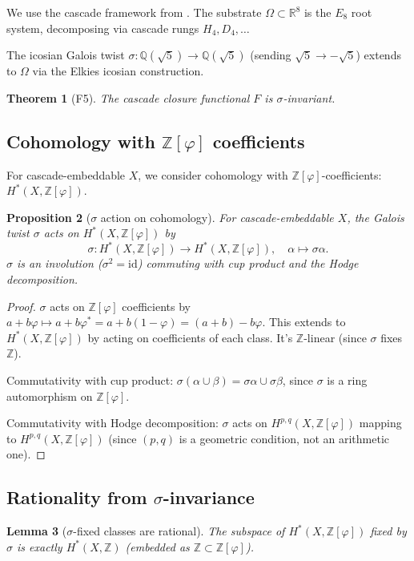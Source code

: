 \documentclass[11pt, a4paper]{amsart}
\newtheorem{theorem}{Theorem}[section]
\newtheorem{lemma}[theorem]{Lemma}
\newtheorem{proposition}[theorem]{Proposition}
\theoremstyle{definition}
\newcommand{\R}{\mathbb{R}}
\newcommand{\Z}{\mathbb{Z}}
\newcommand{\pphi}{\varphi}
\begin{document}
We use the cascade framework from \cite{CascadeFoundations}. The
substrate $\Omega \subset \R^8$ is the $E_8$ root system, decomposing
via cascade rungs $H_4, D_4, \ldots$

The icosian Galois twist $\sigma: \mathbb{Q}(\sqrt 5) \to \mathbb{Q}(\sqrt 5)$
(sending $\sqrt 5 \to -\sqrt 5$) extends to $\Omega$ via the Elkies
icosian construction.

\begin{theorem}[F5]
The cascade closure functional $F$ is $\sigma$-invariant.
\end{theorem}

\subsection{Cohomology with $\Z[\pphi]$ coefficients}

For cascade-embeddable $X$, we consider cohomology with
$\Z[\pphi]$-coefficients: $H^*(X, \Z[\pphi])$.

\begin{proposition}[$\sigma$ action on cohomology]\label{prop:sigmacohom}
For cascade-embeddable $X$, the Galois twist $\sigma$ acts on
$H^*(X, \Z[\pphi])$ by
\[
\sigma: H^*(X, \Z[\pphi]) \to H^*(X, \Z[\pphi]),
\quad \alpha \mapsto \sigma\alpha.
\]
$\sigma$ is an involution ($\sigma^2 = \mathrm{id}$) commuting with
cup product and the Hodge decomposition.
\end{proposition}

\begin{proof}
$\sigma$ acts on $\Z[\pphi]$ coefficients by $a + b\pphi \mapsto a + b\pphi^*
= a + b(1 - \pphi) = (a+b) - b\pphi$. This extends to $H^*(X, \Z[\pphi])$ by
acting on coefficients of each class. It's $\Z$-linear (since $\sigma$
fixes $\Z$).

Commutativity with cup product: $\sigma(\alpha \cup \beta) = \sigma\alpha
\cup \sigma\beta$, since $\sigma$ is a ring automorphism on $\Z[\pphi]$.

Commutativity with Hodge decomposition: $\sigma$ acts on
$H^{p,q}(X, \Z[\pphi])$ mapping to $H^{p,q}(X, \Z[\pphi])$ (since
$(p,q)$ is a geometric condition, not an arithmetic one).
\end{proof}

\subsection{Rationality from $\sigma$-invariance}

\begin{lemma}[$\sigma$-fixed classes are rational]\label{lem:rat}
The subspace of $H^*(X, \Z[\pphi])$ fixed by $\sigma$ is exactly
$H^*(X, \Z)$ (embedded as $\Z \subset \Z[\pphi]$).
\end{lemma}
\end{document}
